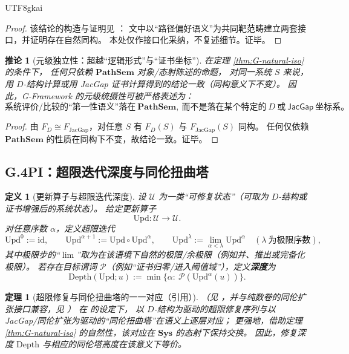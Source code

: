 \documentclass[12pt]{article}
\newtheorem{definition}{定义}[section]
\newtheorem{theorem}{定理}[section]
\newtheorem{corollary}{推论}[section]
\begin{document}
\begin{CJK*}{UTF8}{gkai}
\begin{proof}
该结论的构造与证明见 \cite{GZJacGapDStructEquiv}：
文中以“路径偏好语义”为共同靶范畴建立两套接口，并证明存在自然同构。
本处仅作接口化采纳，不复述细节。证毕。
\end{proof}

\begin{corollary}[元级独立性：超越“逻辑形式”与“证书坐标”]\label{cor:G-meta-independence}
在定理 \ref{thm:G-natural-iso} 的条件下，
任何只依赖 $\mathbf{PathSem}$ 对象/态射陈述的命题，
对同一系统 $S$ 来说，用 $D$-结构计算或用 JacGap 证书计算得到的结论一致（同构意义下不变）。
因此，G-Framework 的元级统摄性可被严格表述为：
\[
  \text{系统评价/比较的“第一性语义”落在}\ \mathbf{PathSem},
  \ \text{而不是落在某个特定的}\ D\ \text{或}\ \mathsf{JacGap}\ \text{坐标系。}
\]
\end{corollary}

\begin{proof}
由 $F_D \cong F_{\mathrm{JacGap}}$，对任意 $S$ 有 $F_D(S)$ 与 $F_{\mathrm{JacGap}}(S)$ 同构。
任何仅依赖 $\mathbf{PathSem}$ 的性质在同构下不变，故结论一致。证毕。
\end{proof}

\subsection{G.4\;PI：超限迭代深度与同伦扭曲塔}

\begin{definition}[更新算子与超限迭代深度]\label{def:G-upd-depth}
设 $\mathcal{U}$ 为一类“可修复状态”（可取为 $D$-结构或证书增强后的系统状态）。
给定更新算子
\[
  \mathrm{Upd}:\mathcal{U}\to\mathcal{U}.
\]
对任意序数 $\alpha$，定义超限迭代
\[
  \mathrm{Upd}^{0}:=\mathrm{id},\qquad
  \mathrm{Upd}^{\alpha+1}:=\mathrm{Upd}\circ \mathrm{Upd}^{\alpha},
  \qquad
  \mathrm{Upd}^{\lambda}:=\lim_{\alpha<\lambda}\mathrm{Upd}^{\alpha}\quad(\lambda\ \text{为极限序数}),
\]
其中极限步的“$\lim$”取为在该语境下自然的极限/余极限（例如并、推出或完备化极限）。
若存在目标谓词 $\mathcal{P}$（例如“证书归零/进入阈值域”），定义\textbf{深度}为
\[
  \mathrm{Depth}(\mathrm{Upd};u)
  :=\min\{\alpha:\ \mathcal{P}(\mathrm{Upd}^{\alpha}(u))\}.
\]
\end{definition}

\begin{theorem}[超限修复与同伦扭曲塔的一一对应（引用）]\label{thm:G-depth-tower}
（见 \cite{GZJacGapDStructEquiv}，并与纯数卷的同伦扩张接口兼容，见 \cite{GaoZheng2025GFramework}）
在 \cite{GZJacGapDStructEquiv} 的设定下，
以 $D$-结构为驱动的超限修复序列与以 JacGap/同伦扩张为驱动的“同伦扭曲塔”在语义上逐层对应；
更强地，借助定理 \ref{thm:G-natural-iso} 的自然性，该对应在 $\mathbf{Sys}$ 的态射下保持交换。
因此，修复深度 $\mathrm{Depth}$ 与相应的同伦塔高度在该意义下等价。
\end{theorem}


\end{CJK*}
\end{document}
